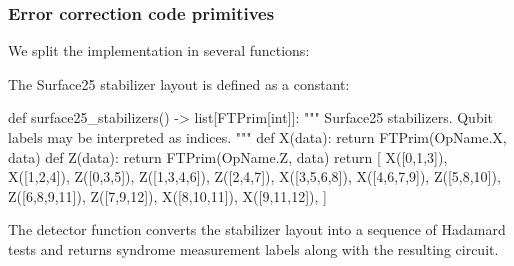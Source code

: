 \subsubsection{Error correction code primitives}

We split the implementation in several functions:

\ls The Surface25 stabilizer layout is defined as a constant:

  \begin{python}
  def surface25_stabilizers() -> list[FTPrim[int]]:
    """ Surface25 stabilizers. Qubit labels may be interpreted as indices. """
    def X(data):
      return FTPrim(OpName.X, data)
    def Z(data):
      return FTPrim(OpName.Z, data)
    return [
              X([0,1,3]), X([1,2,4]),
      Z([0,3,5]), Z([1,3,4,6]), Z([2,4,7]),
             X([3,5,6,8]), X([4,6,7,9]),
      Z([5,8,10]), Z([6,8,9,11]), Z([7,9,12]),
             X([8,10,11]), X([9,11,12]),
    ]
  \end{python}


\li The detector function converts the stabilizer layout into a sequence of Hadamard tests and
    returns syndrome measurement labels along with the resulting circuit.

  \begin{comment}
    \begin{sh}
    printf '\\begin{%
    cat $PROJECT_ROOT/python/qecsurface/qeccs.py | \
      sedlines.sh 'surface25u_detect'
    printf '\\end{%
    \end{sh}
  \end{comment}


